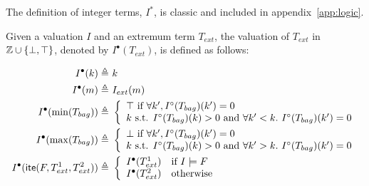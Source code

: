 The definition of integer terms, $I^*$, is classic and included in  appendix~\ref{app:logic}.

Given a valuation $I$ and an extremum term $T_{ext}$, the valuation of $T_{ext}$ in $\mathbb{Z}\cup\{\bot,\top\}$,
denoted by $I^{\bullet}(T_{ext})$, is defined as follows:
\begin{small}
\begin{align*}
I^{\bullet}(k) \triangleq&\ k
\\
I^{\bullet}(m) \triangleq&\ I_{ext}(m)
\\
I^{\bullet}(\min(T_{bag})) \triangleq&\
\left\{\begin{array}{ll}
\top \mbox{ if } \forall k',I^\circ(T_{bag})(k')=0 \\
k \mbox{ s.t. } I^\circ(T_{bag})(k) > 0 \mbox{ and }\forall k'< k.~I^\circ(T_{bag})(k')=0
\end{array}\right.
\\
I^{\bullet}(\max(T_{bag})) \triangleq&\
\left\{\begin{array}{ll}
\bot \mbox{ if } \forall k',I^\circ(T_{bag})(k')=0 \\
k \mbox{ s.t. } I^\circ(T_{bag})(k) > 0 \mbox{ and }\forall k'> k.~I^\circ(T_{bag})(k')=0
\end{array}\right.
\\
I^{\bullet}(\textsf{ite}(F, T^1_{ext}, T^2_{ext})) \triangleq&\
\left\{\begin{array}{ll}
I^{\bullet}(T^1_{ext}) & \mbox{if } I\models F \\
I^{\bullet}(T^2_{ext}) & \mbox{otherwise}
\end{array}\right.
\end{align*}
\end{small}

